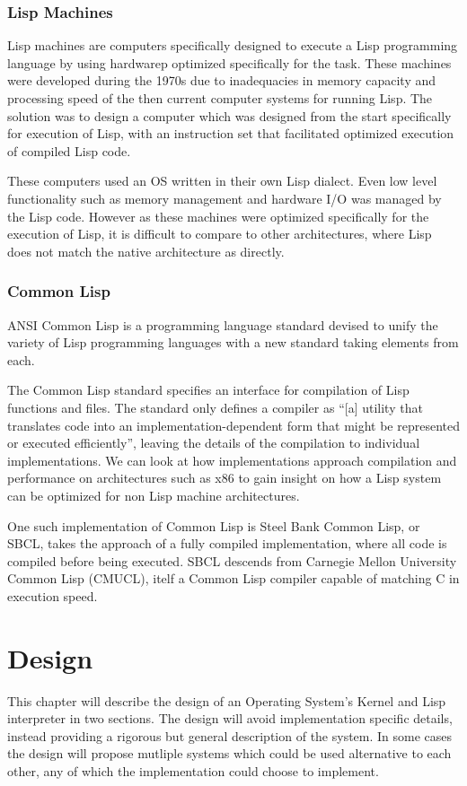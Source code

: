 \documentclass[10pt]{report}
\begin{document}
\subsection{Lisp Machines}
Lisp machines are computers specifically designed to execute a Lisp programming language by using hardwarep optimized specifically for the task. These machines were developed during the 1970s due to inadequacies in memory capacity and processing speed of the then current computer systems for running Lisp\cite{knight-lisp}. The solution was to design a computer which was designed from the start specifically for execution of Lisp, with an instruction set that facilitated optimized execution of compiled Lisp code. 

These computers used an OS written in their own Lisp dialect. Even low level functionality such as memory management and hardware I/O was managed by the Lisp code. However as these machines were optimized specifically for the execution of Lisp, it is difficult to compare to other architectures, where Lisp does not match the native architecture as directly. 

\subsection{Common Lisp}
ANSI Common Lisp is a programming language standard devised to unify the variety of Lisp programming languages with a new standard taking elements from each\cite{cl-hyperspec}. 

The Common Lisp standard specifies an interface for compilation of Lisp functions and files. The standard only defines a compiler as ``[a] utility that translates code into an implementation-dependent form that might be represented or executed efficiently''\cite{cl-hyperspec}, leaving the details of the compilation to individual implementations. We can look at how implementations approach compilation and performance on architectures such as x86 to gain insight on how a Lisp system can be optimized for non Lisp machine architectures.

One such implementation of Common Lisp is Steel Bank Common Lisp, or SBCL, takes the approach of a fully compiled implementation\cite{sbcl-manual}, where all code is compiled before being executed. SBCL descends from Carnegie Mellon University Common Lisp (CMUCL)\cite{sbcl-manual}, itelf a Common Lisp compiler capable of matching C in execution speed\cite{verna2006make}.

\chapter{Design}
This chapter will describe the design of an Operating System's Kernel and Lisp interpreter in two sections. The design will avoid implementation specific details, instead providing a rigorous but general description of the system. In some cases the design will propose mutliple systems which could be used alternative to each other, any of which the implementation could choose to implement.
\end{document}
